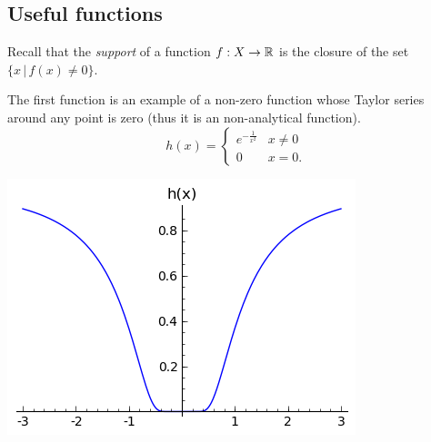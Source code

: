 \documentclass[11pt, english]{article}
\begin{document}
\subsection{Useful functions}
Recall that the \emph{support} of a function $f:X \to \mathbb{R}$ is the closure of the set $\{ x \, | \, f(x) \neq 0 \}$.
\begin{example}
The first function is an example of a non-zero function whose Taylor series around any point is zero (thus it is an non-analytical function).
\[
h(x) =
\begin{cases}
  e^{-\frac{1}{x^2}} & x \neq 0 \\
0 & x = 0.
\end{cases}
\]
\begin{center}
  \includegraphics[scale=.9]{hx}
\end{center}
\end{example}
\end{document}
